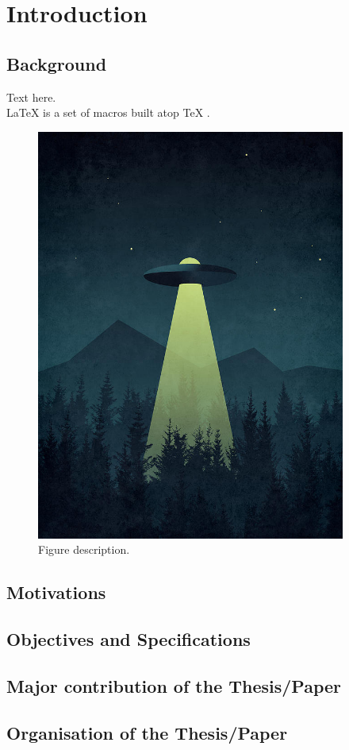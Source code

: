 
\chapter{Introduction}

\section{Background}
Text here.\\
\LaTeX{} \cite{latex2e} is a set of macros built atop \TeX{} \cite{texbook}.

\begin{figure}[H]
\centering
\includegraphics[width=4in]{Chapter1/forest-ufo-ivan-krpan.jpg}
\caption{Figure description.}
\label{fig:boundingboxexample} 
\end{figure}


\section{Motivations}



\section{Objectives and Specifications}



\section{Major contribution of the Thesis/Paper}



\section{Organisation of the Thesis/Paper}



\newpage


